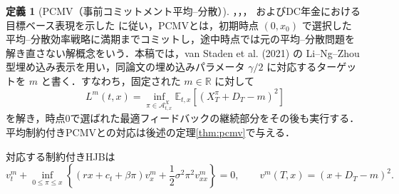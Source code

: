 \documentclass[10pt,a4paper]{article}
\theoremstyle{plain}
\theoremstyle{definition}
\newtheorem{definition}{定義}
\newcommand{\E}{\mathbb{E}}
\newcommand{\R}{\mathbb{R}}
\newcommand{\A}{\mathcal{A}}
\begin{document}
\begin{definition}[PCMV（事前コミットメント平均--分散）]
\label{def:pcmv}
\citet{vanStadenDangForsyth2021}，\citet{LiNg2000}，\citet{ZhouLi2000}，
およびDC年金における目標ベース表現を示した \citet{HojgaardVigna2007,Vigna2014,MenoncinVigna2017} に従い，PCMVとは，初期時点 $(0,x_0)$ で選択した
平均--分散効率戦略に満期までコミットし，途中時点では元の平均--分散問題を
解き直さない解概念をいう．本稿では，van Staden et al. (2021) の
Li--Ng--Zhou型埋め込み表示を用い，同論文の埋め込みパラメータ
$\gamma/2$ に対応するターゲットを $m$ と書く．すなわち，固定された
$m\in\R$ に対して
\begin{equation}
  L^m(t,x)=\inf_{\pi\in\A^X_{t,x}}
  \E_{t,x}\left[(X_T^\pi+D_T-m)^2\right]
  \label{eq:embedded-x}
\end{equation}
を解き，時点0で選ばれた最適フィードバックの継続部分をその後も実行する．
平均制約付きPCMVとの対応は後述の定理\ref{thm:pcmv}で与える．
\end{definition}

対応する制約付きHJBは
\begin{equation}
  v_t^m+
  \inf_{0\leq\pi\leq x}
  \left\{
  (rx+c_t+\beta\pi)v_x^m
  +\frac12\sigma^2\pi^2v_{xx}^m
  \right\}=0,
  \qquad
  v^m(T,x)=(x+D_T-m)^2.
  \label{eq:pcmv-hjb-x}
\end{equation}
\end{document}
